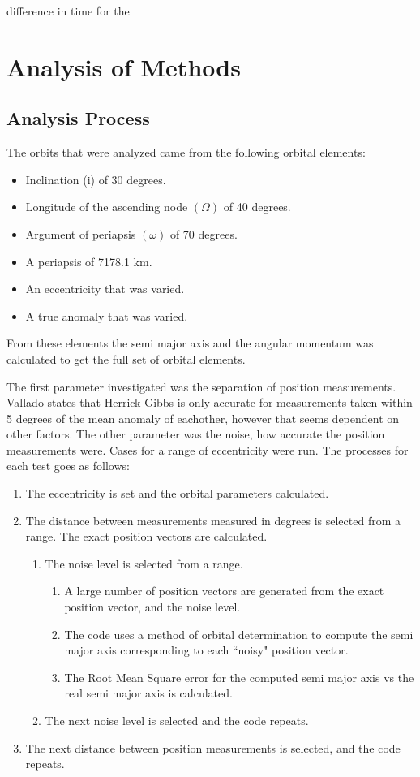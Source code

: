 \documentclass[12pt]{article}
\begin{document}
	
	difference in time for the 
	\fi
	\section{Analysis of Methods}
	\subsection{Analysis Process}
	The orbits that were analyzed came from the following orbital elements:
	\begin{itemize}\singlespacing
		\item Inclination (i) of 30 degrees.
		\item Longitude of the ascending node $(\Omega)$ of 40 degrees.
		\item Argument of periapsis $(\omega)$ of 70 degrees.
		\item A periapsis of 7178.1 km. 
		\item An eccentricity that was varied.
		\item A true anomaly that was varied.
	\end{itemize}\doublespacing
	From these elements the semi major axis and the angular momentum was calculated to get the full set of orbital elements. 
	
	The first parameter investigated was the separation of position measurements.  Vallado\cite{vallado2007fundamentals} states that Herrick-Gibbs is only accurate for measurements taken within 5 degrees of the mean anomaly of eachother, however that seems dependent on other factors. The other parameter was the noise, how accurate the position measurements were. Cases for a range of eccentricity were run. The processes for each test goes as follows:
	\begin{enumerate}
		\item The eccentricity is set and the orbital parameters calculated.
		\item The distance between measurements measured in degrees is selected from a range. The exact position vectors are calculated.
		\begin{enumerate}
			\item The noise level is selected from a range. 
			\begin{enumerate}
				\item A large number of position vectors are generated from the exact position vector, and the noise level.
				\item The code uses a method of orbital determination to compute the semi major axis corresponding to each ``noisy" position vector. 
				\item The Root Mean Square error for the computed semi major axis vs the real semi major axis is calculated. 

			\end{enumerate}
				\item The next noise level is selected and the code repeats.
		\end{enumerate}
		\item The next distance between position measurements is selected, and the code repeats.
	\end{enumerate}
\end{document}
